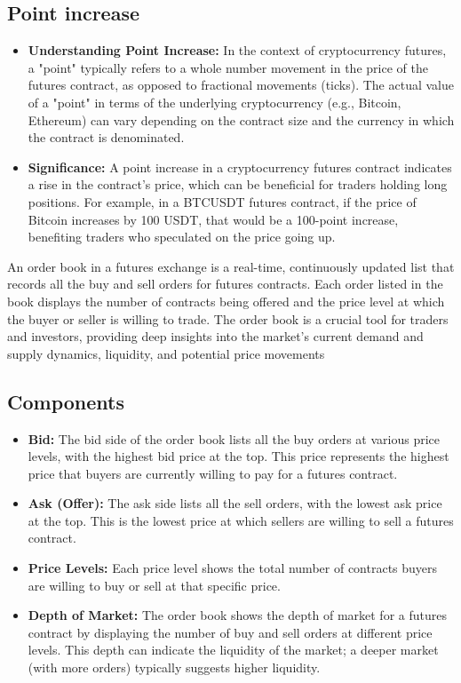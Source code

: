 \documentclass{report}
\begin{document}
    \subsection{Point increase}
    \begin{itemize}
        \item \textbf{Understanding Point Increase:} In the context of cryptocurrency futures, a "point" typically refers to a whole number movement in the price of the futures contract, as opposed to fractional movements (ticks). The actual value of a "point" in terms of the underlying cryptocurrency (e.g., Bitcoin, Ethereum) can vary depending on the contract size and the currency in which the contract is denominated.
        \item \textbf{Significance:} A point increase in a cryptocurrency futures contract indicates a rise in the contract's price, which can be beneficial for traders holding long positions. For example, in a BTCUSDT futures contract, if the price of Bitcoin increases by 100 USDT, that would be a 100-point increase, benefiting traders who speculated on the price going up.
    \end{itemize}

    \pagebreak 
    \bigbreak \noindent 
    An order book in a futures exchange is a real-time, continuously updated list that records all the buy and sell orders for futures contracts. Each order listed in the book displays the number of contracts being offered and the price level at which the buyer or seller is willing to trade. The order book is a crucial tool for traders and investors, providing deep insights into the market's current demand and supply dynamics, liquidity, and potential price movements
    \bigbreak \noindent 
    \subsection{Components}
    \bigbreak \noindent 
    \begin{itemize}
        \item \textbf{Bid:} The bid side of the order book lists all the buy orders at various price levels, with the highest bid price at the top. This price represents the highest price that buyers are currently willing to pay for a futures contract.
        \item \textbf{Ask (Offer):} The ask side lists all the sell orders, with the lowest ask price at the top. This is the lowest price at which sellers are willing to sell a futures contract.
        \item \textbf{Price Levels:} Each price level shows the total number of contracts buyers are willing to buy or sell at that specific price.
        \item \textbf{Depth of Market:} The order book shows the depth of market for a futures contract by displaying the number of buy and sell orders at different price levels. This depth can indicate the liquidity of the market; a deeper market (with more orders) typically suggests higher liquidity.
    \end{itemize}
\end{document}
